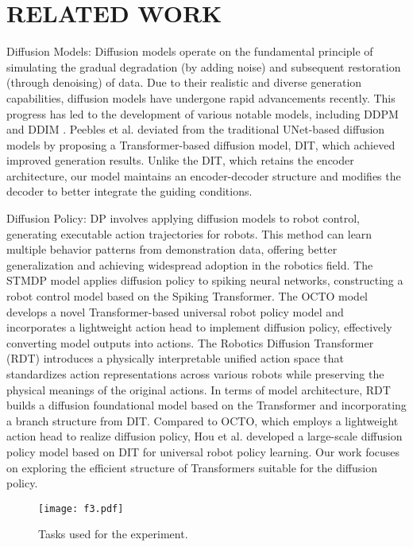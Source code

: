 \section{RELATED WORK}
Diffusion Models: Diffusion models operate on the fundamental principle of simulating the gradual degradation (by adding noise) and subsequent restoration (through denoising) of data. Due to their realistic and diverse generation capabilities, diffusion models have undergone rapid advancements recently. This progress has led to the development of various notable models, including DDPM \cite{ho2020denoising} and DDIM \cite{song2020denoising}. Peebles et al. \cite{peebles2023scalable} deviated from the traditional UNet-based diffusion models by proposing a Transformer-based diffusion model, DIT, which achieved improved generation results. Unlike the DIT, which retains the encoder architecture, our model maintains an encoder-decoder structure and modifies the decoder to better integrate the guiding conditions.

Diffusion Policy: DP \cite{chi2023diffusion} involves applying diffusion models to robot control, generating executable action trajectories for robots. This method can learn multiple behavior patterns from demonstration data, offering better generalization and achieving widespread adoption in the robotics field. The STMDP model \cite{wang2024brain} applies diffusion policy to spiking neural networks, constructing a robot control model based on the Spiking Transformer. The OCTO model \cite{team2024octo} develops a novel Transformer-based universal robot policy model and incorporates a lightweight action head to implement diffusion policy, effectively converting model outputs into actions. The Robotics Diffusion Transformer (RDT) \cite{liu2024rdt} introduces a physically interpretable unified action space that standardizes action representations across various robots while preserving the physical meanings of the original actions. In terms of model architecture, RDT builds a diffusion foundational model based on the Transformer and incorporating a branch structure from DIT. Compared to OCTO, which employs a lightweight action head to realize diffusion policy, Hou et al. \cite{hou2024diffusion} developed a large-scale diffusion policy model based on DIT for universal robot policy learning. Our work focuses on exploring the efficient structure of Transformers suitable for the diffusion policy.


\begin{figure*}[htbp]
	\centering
	\texttt{[image: f3.pdf]} %
	\caption{Tasks used for the experiment. }
	\label{fig3}
\end{figure*}